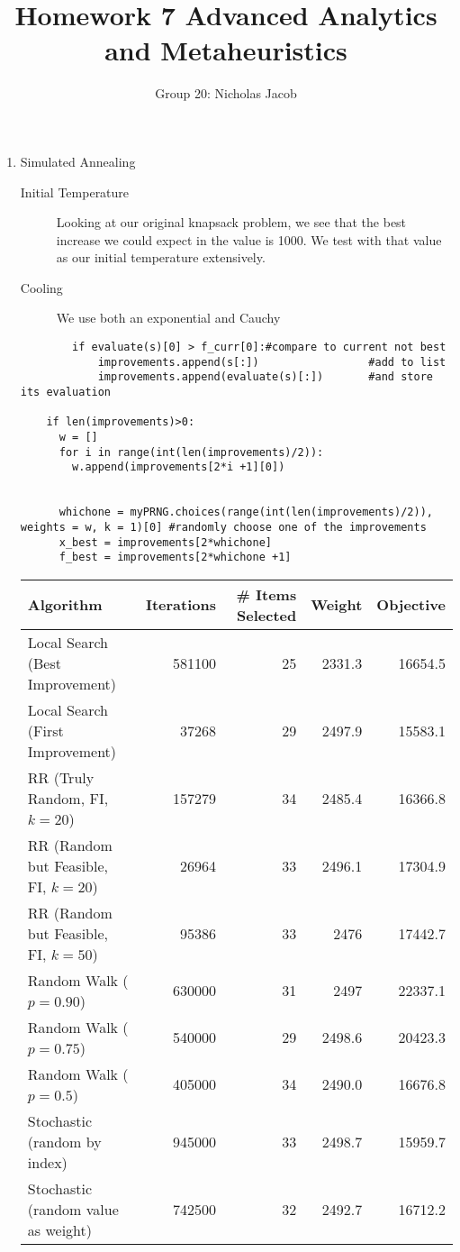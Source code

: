 \documentclass[11pt]{article}
\author{Group 20: Nicholas Jacob}
\title{Homework 7 Advanced Analytics and Metaheuristics}
\begin{document}
\maketitle

\begin{enumerate}
\item Simulated Annealing

\begin{description}
\item[Initial Temperature]  Looking at our original knapsack problem, we see that the best increase we could expect in the value is 1000.  We test with that value as our initial temperature extensively.
\item[Cooling]  We use both an exponential and Cauchy   


\end{description}
\begin{verbatim}
        if evaluate(s)[0] > f_curr[0]:#compare to current not best
            improvements.append(s[:])                 #add to list
            improvements.append(evaluate(s)[:])       #and store its evaluation

    if len(improvements)>0:
      w = []
      for i in range(int(len(improvements)/2)):
        w.append(improvements[2*i +1][0])


      whichone = myPRNG.choices(range(int(len(improvements)/2)), weights = w, k = 1)[0] #randomly choose one of the improvements
      x_best = improvements[2*whichone]
      f_best = improvements[2*whichone +1]
\end{verbatim}
\begin{tabular}{lrrrr}
Algorithm&Iterations&\# Items Selected&Weight&Objective\\ \hline
Local Search (Best Improvement)&581100&25&2331.3&16654.5\\ 
Local Search (First Improvement)&37268&29&2497.9&15583.1\\
RR (Truly Random, FI, $k=20$) & 157279&34&2485.4&16366.8\\
RR (Random but Feasible, FI, $k = 20$)& 26964&33&2496.1&17304.9\\
RR (Random but Feasible, FI, $k = 50$)& 95386&33&2476&17442.7\\
Random Walk ($p = 0.90$) & 630000&31&2497&22337.1\\
Random Walk ($p = 0.75$) & 540000&29&2498.6&20423.3\\
Random Walk ($p = 0.5$) & 405000&34&2490.0&16676.8\\
Stochastic (random by index) &945000&33&2498.7&15959.7\\
Stochastic (random value as weight)&742500&32&2492.7&16712.2\\
\hline
\end{tabular}

\end{enumerate}
\end{document}
